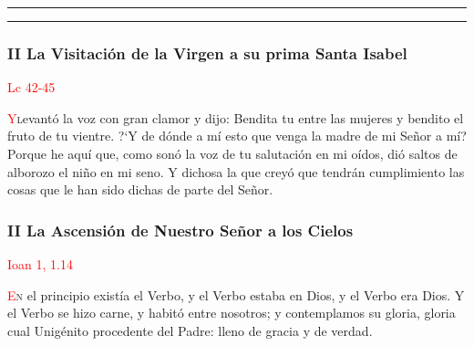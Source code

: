 \documentclass[10pt,twoside]{book}
\begin{document}
\begin{center}
      {\rule{20em}{0.4pt}}
\end{center}



\begin{center}
      {\rule{20em}{0.4pt}}
\end{center}

\begin{paracol}{2}
      \begin{leftcolumn*}
            \begin{center}
                  \subsubsection*{II La Visitación de la Virgen a su prima Santa Isabel}
                  \textcolor{red}{Lc 42-45}
            \end{center}

            \lettrine[lines=2]{\textcolor{red}{Y}} levantó la voz con gran clamor y dijo: Bendita tu entre 
            las mujeres y bendito el fruto de tu vientre. {?`}Y de dónde a mí esto que venga la madre de mi Señor a mí? Porque he aquí que, 
            como sonó la voz de tu salutación en mi oídos, dió saltos de alborozo el niño en mi seno. Y dichosa la que creyó que tendrán
            cumplimiento las cosas que le han sido dichas de parte del Señor.

            
      \end{leftcolumn*}

      \begin{rightcolumn}
            \begin{center}
                  \subsubsection*{II La Ascensión de Nuestro Señor a los Cielos}
                  \textcolor{red}{Ioan 1, 1.14}
            \end{center}

            \lettrine[lines=2]{\textcolor{red}{E}}n el principio existía el Verbo, y el Verbo estaba en Dios, y el Verbo era Dios. Y el Verbo se hizo
            carne, y habitó entre nosotros; y contemplamos su gloria, gloria cual Unigénito procedente del Padre: lleno de gracia y de verdad.


\end{rightcolumn}
\end{paracol}
\end{document}

